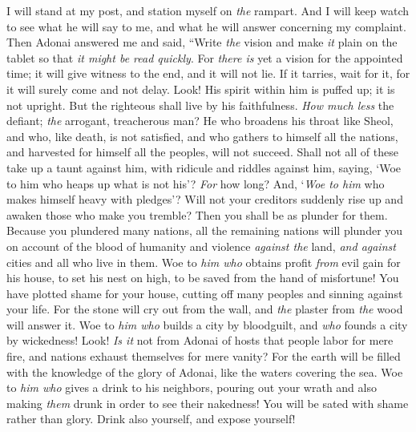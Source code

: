 \begin{biblechapter} %
 I will stand at my post, 
and station myself on \textit{the} rampart. 
And I will keep watch to see what he will say to me, 
and what he will answer concerning my complaint.
\verse Then Adonai answered me and said, 
“Write \textit{the} vision and make \textit{it} plain on the tablet 
so that \textit{it might be read quickly}.
\verse For \textit{there is} yet a vision for the appointed time; 
it will give witness to the end, and it will not lie. 
If it tarries, wait for it, 
for it will surely come and not delay.
\verse Look! His spirit within him is puffed up; 
it is not upright. 
But the righteous shall live by his faithfulness.
\verse \textit{How much less} the defiant; 
\textit{the} arrogant, treacherous man? 
He who broadens his throat like Sheol, 
and who, like death, is not satisfied, 
and who gathers to himself all the nations, 
and harvested for himself all the peoples, 
will not succeed.
\verse Shall not all of these take up a taunt against him, 
with ridicule and riddles against him, saying, 
‘Woe to him who heaps up what is not his’? 
\textit{For} how long? 
And, ‘\textit{Woe to him} who makes himself heavy with pledges’?
\verse Will not your creditors suddenly rise up 
and awaken those who make you tremble? 
Then you shall be as plunder for them.
\verse Because you plundered many nations, 
all the remaining nations will plunder you 
on account of the blood of humanity 
and violence \textit{against the} land, 
\textit{and against} cities and all who live in them.
\verse Woe to \textit{him who} obtains profit \textit{from} evil gain for his house, 
to set his nest on high, 
to be saved from the hand of misfortune!
\verse You have plotted shame for your house, 
cutting off many peoples 
and sinning against your life.
\verse For the stone will cry out from the wall, 
and \textit{the} plaster from \textit{the} wood will answer it.
\verse Woe to \textit{him who} builds a city by bloodguilt, 
and \textit{who} founds a city by wickedness!
\verse Look! \textit{Is it} not from Adonai of hosts 
that people labor for mere fire, 
and nations exhaust themselves for mere vanity?
\verse For the earth will be filled 
with the knowledge of the glory of Adonai, 
like the waters covering the sea.
\verse Woe to \textit{him who} gives a drink to his neighbors, 
pouring out your wrath and also making \textit{them} drunk 
in order to see their nakedness!
\verse You will be sated with shame rather than glory. 
Drink also yourself, and expose yourself! 

\end{biblechapter}
